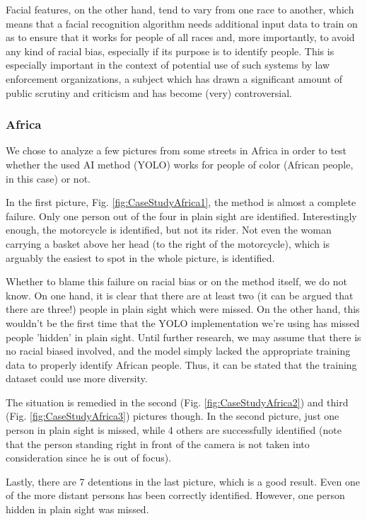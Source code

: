 \documentclass[runningheads,a4paper,11pt]{report}
\begin{document}
Facial features, on the other hand, tend to vary from one race to another, which means that a facial recognition algorithm needs additional input data to train on as to ensure that it works for people of all races and, more importantly, to avoid any kind of racial bias, especially if its purpose is to identify people. This is especially important in the context of potential use of such systems by law enforcement organizations, a subject which has drawn a significant amount of public scrutiny and criticism and has become (very) controversial.

\subsubsection{Africa}
We chose to analyze a few pictures from some streets in Africa in order to test whether the used AI method (YOLO) works for people of color (African people, in this case) or not.

In the first picture, Fig. \ref{fig:CaseStudyAfrica1}, the method is almost a complete failure. Only one person out of the four in plain sight are identified. Interestingly enough, the motorcycle is identified, but not its rider. Not even the woman carrying a basket above her head (to the right of the motorcycle), which is arguably the easiest to spot in the whole picture, is identified.


Whether to blame this failure on racial bias or on the method itself, we do not know. On one hand, it is clear that there are at least two (it can be argued that there are three!) people in plain sight which were missed. On the other hand, this wouldn't be the first time that the YOLO implementation we're using has missed people 'hidden' in plain sight. Until further research, we may assume that there is no racial biased involved, and the model simply lacked the appropriate training data to properly identify African people. Thus, it can be stated that the training dataset could use more diversity.

The situation is remedied in the second (Fig. \ref{fig:CaseStudyAfrica2}) and third (Fig. \ref{fig:CaseStudyAfrica3}) pictures though. In the second picture, just one person in plain sight is missed, while 4 others are successfully identified (note that the person standing right in front of the camera is not taken into consideration since he is out of focus).


Lastly, there are 7 detentions in the last picture, which is a good result. Even one of the more distant persons has been correctly identified. However, one person hidden in plain sight was missed.
\end{document}
